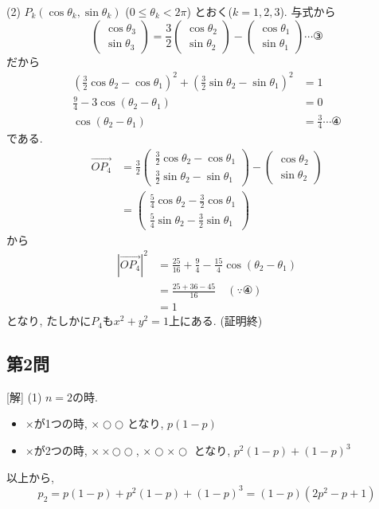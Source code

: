 \documentclass[../main.tex]{subfiles}
\begin{document}
(2) $P_k(\cos\theta_k, \sin\theta_k)$ ($0 \le \theta_k < 2\pi$) とおく($k=1, 2, 3$). 与式から
\[
  \begin{pmatrix} \cos\theta_3 \\ \sin\theta_3
  \end{pmatrix} = \frac{3}{2}
  \begin{pmatrix} \cos\theta_2 \\ \sin\theta_2
  \end{pmatrix} -
  \begin{pmatrix} \cos\theta_1 \\ \sin\theta_1
\end{pmatrix} \cdots \text{③} \]
だから
\begin{align*}
  \left(\frac{3}{2}\cos\theta_2 - \cos\theta_1\right)^2 + \left(\frac{3}{2}\sin\theta_2 - \sin\theta_1\right)^2 &= 1 \\
  \frac{9}{4} - 3\cos(\theta_2 - \theta_1) &= 0 \\
  \cos(\theta_2 - \theta_1) &= \frac{3}{4} \cdots \text{④}
\end{align*}
である.
\begin{align*}
  \overrightarrow{OP_4} &= \frac{3}{2}
  \begin{pmatrix} \frac{3}{2}\cos\theta_2 - \cos\theta_1 \\ \frac{3}{2}\sin\theta_2 - \sin\theta_1
  \end{pmatrix} -
  \begin{pmatrix} \cos\theta_2 \\ \sin\theta_2
  \end{pmatrix} \\
  &=
  \begin{pmatrix} \frac{5}{4}\cos\theta_2 - \frac{3}{2}\cos\theta_1 \\ \frac{5}{4}\sin\theta_2 - \frac{3}{2}\sin\theta_1
  \end{pmatrix}
\end{align*}
から
\begin{align*}
  |\overrightarrow{OP_4}|^2 &= \frac{25}{16} + \frac{9}{4} - \frac{15}{4}\cos(\theta_2 - \theta_1) \\
  &= \frac{25+36-45}{16} \quad (\because \text{④}) \\
  &= 1
\end{align*}
となり, たしかに$P_4$も$x^2+y^2=1$上にある. (証明終)

\subsection*{第2問}
[解]
(1) $n=2$の時.
\begin{itemize}
  \item[(ア)] $\times$が1つの時, $\times\bigcirc\bigcirc$ となり, $p(1-p)$
  \item[(イ)] $\times$が2つの時, $\times\times\bigcirc\bigcirc$, $\times\bigcirc\times\bigcirc$ となり, $p^2(1-p) + (1-p)^3$
\end{itemize}
以上から,
\[ p_2 = p(1-p) + p^2(1-p) + (1-p)^3 = (1-p)(2p^2-p+1) \]
\end{document}
